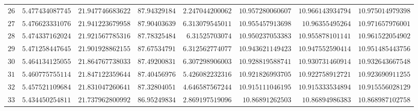 {\begin{longtable}{@{}rrrrrrrr@{}}
$26$ & $5.477434087745$ & $21.947746683622$ & $87.94329184$ & $2.247044200062$ & $10.957280060607$ & $10.966143934794$ & $10.975014979398$\\
$27$ & $5.476623331076$ & $21.941223679958$ & $87.90403639$ & $6.313079545011$ & $10.955457913698$ & $10.96355495264$ & $10.971657976001$\\
$28$ & $5.474337162024$ & $21.921567785316$ & $87.78325484$ & $6.31525703074$ & $10.950237053383$ & $10.955878101141$ & $10.961522054902$\\
$29$ & $5.471258447645$ & $21.901928862155$ & $87.67534791$ & $6.312562774077$ & $10.943621149423$ & $10.947552590414$ & $10.951485443756$\\
$30$ & $5.464134125055$ & $21.864767738033$ & $87.49200831$ & $6.307298906003$ & $10.928819588741$ & $10.930731460914$ & $10.932643667548$\\
$31$ & $5.460775755114$ & $21.847122359644$ & $87.40456976$ & $5.426082232316$ & $10.921826993705$ & $10.922758912721$ & $10.923690911255$\\
$32$ & $5.457521109684$ & $21.831047260641$ & $87.32804051$ & $4.646587567244$ & $10.915111046195$ & $10.915333534894$ & $10.915556028129$\\
$33$ & $5.434450254811$ & $21.737962800992$ & $86.95249834$ & $2.869197519096$ & $10.86891262503$ & $10.86894986383$ & $10.868987102758$\\
\end{longtable}
}


